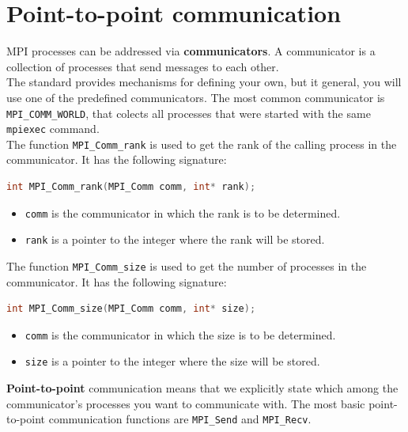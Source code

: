 \section{Point-to-point communication}

MPI processes can be addressed via \textbf{communicators}. A communicator is a collection of
processes that send messages to each other.\\

The standard provides mechanisms for defining your own, but it general, you will use one of
the predefined communicators. The most common communicator is \texttt{MPI\_COMM\_WORLD},
that colects all processes that were started with the same \texttt{mpiexec} command.\\

The function \texttt{MPI\_Comm\_rank} is used to get the rank of the calling process in the
communicator. It has the following signature:

\begin{lstlisting}[language=C++]
int MPI_Comm_rank(MPI_Comm comm, int* rank);
\end{lstlisting}

\begin{itemize}
    \item \texttt{comm} is the communicator in which the rank is to be determined.
    \item \texttt{rank} is a pointer to the integer where the rank will be stored.
\end{itemize}

The function \texttt{MPI\_Comm\_size} is used to get the number of processes in the communicator.
It has the following signature:

\begin{lstlisting}[language=C++]
int MPI_Comm_size(MPI_Comm comm, int* size);
\end{lstlisting}

\begin{itemize}
    \item \texttt{comm} is the communicator in which the size is to be determined.
    \item \texttt{size} is a pointer to the integer where the size will be stored.
\end{itemize}

\textbf{Point-to-point} communication means that we explicitly state which among the 
communicator's processes you want to communicate with. The most basic point-to-point
communication functions are \texttt{MPI\_Send} and \texttt{MPI\_Recv}.\\

